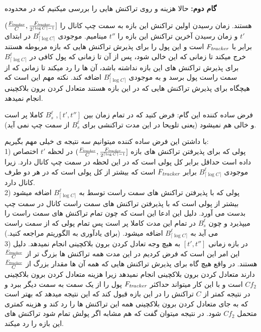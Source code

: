 \textbf{گام دوم:}
حالا هزینه \on و \off روی تراکنش هایی را بررسی میکنیم که در محدوده

$(\frac{F_{\textit{tracker}}}{C},\frac{F_{\textit{tracker}}}{2^{\lceil\log{C}\rceil-1}}]$
هستند. زمان رسیدن اولین تراکنش این بازه به سمت چپ کانال را
$t'$
و زمان رسیدن آخرین تراکنش این بازه را
$t''$
مینامیم.
موجودی
$B_{\lceil\log{C}\rceil}^{\ell}$
در ابتدای \epoch برابر با
$F_{\textit{tracker}}$
است و \on این پول را برای پذیرش تراکنش هایی که بازه مربوطه هستند خرج میکند تا زمانی که این \bucket خالی شود، پس از آن \on تا زمانی که پول کافی در 
$B_{\lceil\log{C}\rceil}^{\ell}$
برای پذیرش تراکنش های این بازه نداشته باشد، آن ها را رد میکند تا زمانی که از سمت راست پول برسد و به موجودی
$B_{\lceil\log{C}\rceil}^{\ell}$
اضافه کند. نکته مهم این است که \on هیچگاه برای پذیرش تراکنش هایی که در این بازه هستند متعادل کردن برون بلاکچینی انجام نمیدهد.



فرض ساده کننده این گام:  فرض کنید که در تمام زمان بین
$[t',t'']$,
$B_s^{\ell}$
کاملا پر است و خالی هم نمیشود (یعنی تلویحا در این مدت تراکنشی برای \bucket
$B_s^{\ell}$
از سمت چپ نمی آید).

با داشتن این فرض ساده کننده میتوانیم سه نتیجه ی خیلی مهم بگیریم:\\
1) پولی که 
\on 
 برای پذیرفتن تراکنش های بازه
$(\frac{F_{\textit{tracker}}}{C},\frac{F_{\textit{tracker}}}{2^{\lceil\log{C}\rceil-1}}]$
در لحظه
$t'$
اختصاص داده است حداقل برابر کل پولی است که \off در این لحظه در سمت چپ کانال دارد. زیرا موجودی 
$B_{\lceil\log{C}\rceil}^{\ell}$
برابر 
$F_{\textit{tracker}}$
است که بیشتر از کل پولی است که \off در هر دو طرف کانال دارد.\\
2) پولی که با پذیرفتن تراکنش های سمت راست توسط \on به \bucket
$B_{\lceil\log{C}\rceil}^{\ell}$
اضافه میشود بیشتر از پولی است که \off  با پذیرفتن تراکنش های سمت راست کانال در سمت چپ بدست می آورد. دلیل این ادعا این است که  چون \on تمام تراکنش های سمت راست را میپذیرد و چون
$B_s^{\ell}$
در تمام این مدت کاملا پر است پس تمام پولی که از سمت راست می آید به
$B_{\lceil\log{C}\rceil}^{\ell}$
اضافه میشود. (برای یادآوری به الگوریتم مراجعه کنید.)\\
3) \off
در بازه زمانی 
$[t',t'']$
به هیچ وجه تعادل کردن برون بلاکچینی انجام نمیدهد. دلیل این امر این است که فرض کردیم در این مدت همه تراکنش ها بزرگ تر از
$\frac{F_{\textit{tracker}}}{C}$
هستند. در واقع \off هیچ گاه برای پذیرش تراکنش هایی که همه آن ها مقدار بزرگ از 
$\frac{F_{\textit{tracker}}}{C}$
دارند متعادل کردن برون بلاکچینی انجام نمیدهد زیرا هزینه متعادل کردن برون بلاکچینی 
$Cf_2$
است و با این کار \off میتواند حداکثر
$F_{\textit{tracker}}$
پول را از یک سمت به سمت دیگر ببرد و در نتیجه کمتر از 
$C$
تراکنش را در این بازه قبول کند که این نتیجه میدهد که بهتر است که به جای متعادل کردن برون بلاکچینی \off همه این تراکنش ها را رد کند و هزینه کمتری متحمل
$Cf_2$ 
شود. در نتیجه میتوان گفت که \off هم مشابه \on اگر پولش تمام شود تراکنش های این بازه را رد میکند. 

